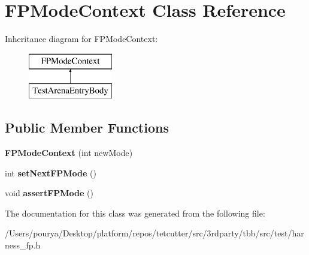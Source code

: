 \hypertarget{classFPModeContext}{}\section{F\+P\+Mode\+Context Class Reference}
\label{classFPModeContext}
Inheritance diagram for F\+P\+Mode\+Context\+:\begin{figure}[H]
\begin{center}
\leavevmode
\includegraphics[height=2.000000cm]{classFPModeContext}
\end{center}
\end{figure}
\subsection*{Public Member Functions}
\begin{DoxyCompactItemize}
\item 
\hypertarget{classFPModeContext_ad346be76266e8181e2358a22df03f5a5}{}{\bfseries F\+P\+Mode\+Context} (int new\+Mode)\label{classFPModeContext_ad346be76266e8181e2358a22df03f5a5}

\item 
\hypertarget{classFPModeContext_a470d59bbc6d05e8d324b4e04bb98c97f}{}int {\bfseries set\+Next\+F\+P\+Mode} ()\label{classFPModeContext_a470d59bbc6d05e8d324b4e04bb98c97f}

\item 
\hypertarget{classFPModeContext_a067f6690d21b89d312acc577fb52c428}{}void {\bfseries assert\+F\+P\+Mode} ()\label{classFPModeContext_a067f6690d21b89d312acc577fb52c428}

\end{DoxyCompactItemize}


The documentation for this class was generated from the following file\+:\begin{DoxyCompactItemize}
\item 
/\+Users/pourya/\+Desktop/platform/repos/tetcutter/src/3rdparty/tbb/src/test/harness\+\_\+fp.\+h\end{DoxyCompactItemize}
